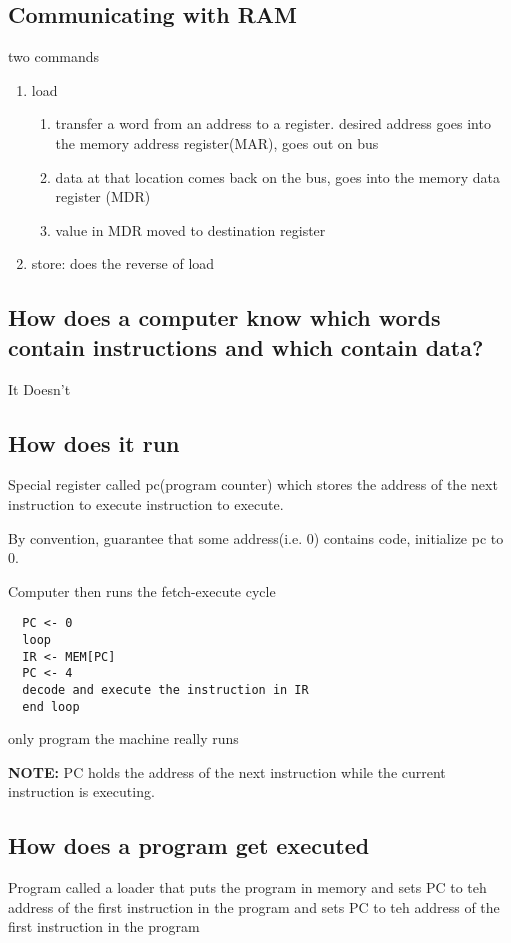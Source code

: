 \documentclass[11pt]{amsart}
\begin{document}
\subsection{Communicating with RAM}
\par two commands
\begin{enumerate}
  \item load
    \begin{enumerate}
      \item transfer a word from an address to a register. desired address
        goes into the memory address register(MAR), goes out on bus
      \item data at that location comes back on the bus, goes into the memory
        data register (MDR)
      \item value in MDR moved to destination register
    \end{enumerate}
  \item store: does the reverse of load
\end{enumerate}
\subsection{How does a computer know which words contain instructions and which
  contain data?}
\par It Doesn't
\subsection{How does it run}
\par Special register called pc(program counter) which stores the address of
the next instruction to execute
instruction to execute.
\par By convention, guarantee that some address(i.e. 0) contains code,
initialize pc to 0.
\par Computer then runs the fetch-execute cycle
\begin{verbatim}
  PC <- 0
  loop
  IR <- MEM[PC]
  PC <- 4
  decode and execute the instruction in IR
  end loop
\end{verbatim}
\par only program the machine really runs
\par \textbf{NOTE:}  PC holds the address of the next instruction while the
current instruction is executing.
\subsection{How does a program get executed}
\par Program called a loader that puts the program in memory and sets PC to teh
address of the first instruction in the program and sets PC to teh address of
the first instruction in the program
\end{document}

